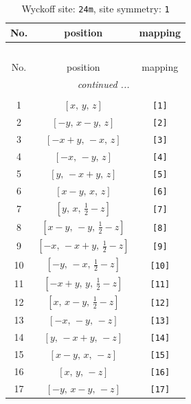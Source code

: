 \documentclass[fleqn,8pt]{jsarticle}
\begin{document}
\begin{longtable}{ccc}
\caption{Wyckoff site: {\tt 24m}, site symmetry: {\tt 1}}
 \\
 \hline \hline
No. & position & mapping \\ \hline \endfirsthead

\multicolumn{2}{l}{\tablename\ \thetable{}} \\
 \hline \hline
No. & position & mapping \\ \hline \endhead

 \hline \hline
\multicolumn{2}{r}{\footnotesize\it continued ...} \\ \endfoot

 \hline \hline
\multicolumn{2}{r}{} \\ \endlastfoot

1 & $\left[ x,\, y,\, z \right]$ & {\tt [1]} \\ \hline
2 & $\left[ - y,\, x - y,\, z \right]$ & {\tt [2]} \\ \hline
3 & $\left[ - x + y,\, - x,\, z \right]$ & {\tt [3]} \\ \hline
4 & $\left[ - x,\, - y,\, z \right]$ & {\tt [4]} \\ \hline
5 & $\left[ y,\, - x + y,\, z \right]$ & {\tt [5]} \\ \hline
6 & $\left[ x - y,\, x,\, z \right]$ & {\tt [6]} \\ \hline
7 & $\left[ y,\, x,\, \frac{1}{2} - z \right]$ & {\tt [7]} \\ \hline
8 & $\left[ x - y,\, - y,\, \frac{1}{2} - z \right]$ & {\tt [8]} \\ \hline
9 & $\left[ - x,\, - x + y,\, \frac{1}{2} - z \right]$ & {\tt [9]} \\ \hline
10 & $\left[ - y,\, - x,\, \frac{1}{2} - z \right]$ & {\tt [10]} \\ \hline
11 & $\left[ - x + y,\, y,\, \frac{1}{2} - z \right]$ & {\tt [11]} \\ \hline
12 & $\left[ x,\, x - y,\, \frac{1}{2} - z \right]$ & {\tt [12]} \\ \hline
13 & $\left[ - x,\, - y,\, - z \right]$ & {\tt [13]} \\ \hline
14 & $\left[ y,\, - x + y,\, - z \right]$ & {\tt [14]} \\ \hline
15 & $\left[ x - y,\, x,\, - z \right]$ & {\tt [15]} \\ \hline
16 & $\left[ x,\, y,\, - z \right]$ & {\tt [16]} \\ \hline
17 & $\left[ - y,\, x - y,\, - z \right]$ & {\tt [17]} \\ \hline

\end{longtable}
\end{document}
